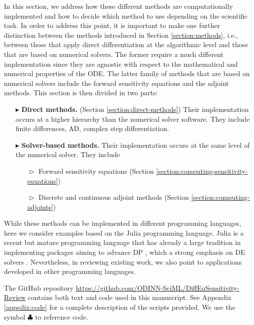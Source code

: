 
In this section, we address how these different methods are computationally implemented and how to decide which method to use depending on the scientific task.
In order to address this point, it is important to make one further distinction between the methods introduced in Section \ref{section:methods}, i.e., between those that apply direct differentiation at the algorithmic level and those that are based on numerical solvers.  
The former require a much different implementation since they are agnostic with respect to the mathematical and numerical properties of the ODE.
The latter family of methods that are based on numerical solvers include the forward sensitivity equations and the adjoint methods.
This section is then divided in two parts:
\begin{itemize}
    \item[$ \blacktriangleright$] \textbf{Direct methods.} (Section \ref{section:direct-methods}) Their implementation occurs at a higher hierarchy than the numerical solver software. They include finite differences, AD, complex step differentiation.
    \item[$ \blacktriangleright$] \textbf{Solver-based methods.} Their implementation occurs at the same level of the numerical solver. They include 
    \begin{itemize}
        \item [$\vartriangleright$] Forward sensitivity equations (Section \ref{section:computing-sensitivity-equations})
        \item [$\vartriangleright$] Discrete and continuous adjoint methods (Section \ref{section:computing-adjoints})
    \end{itemize}
\end{itemize}
While these methods can be implemented in different programming languages, here we consider examples based on the Julia programming language. 
Julia is a recent but mature programming language that has already a large tradition in implementing packages aiming to advance DP \cite{Bezanson_Karpinski_Shah_Edelman_2012, Julialang_2017}, which a strong emphasis on DE solvers \cite{Rackauckas_Nie_2016, rackauckas2020universal}.
Nevertheless, in reviewing existing work, we also point to applications developed in other programming languages.

The GitHub repository \url{https://github.com/ODINN-SciML/DiffEqSensitivity-Review} contains both text and code used in this manuscript. 
See Appendix \ref{appedix:code} for a complete description of the scripts provided. 
We use the symbol $\clubsuit$ to reference code. 